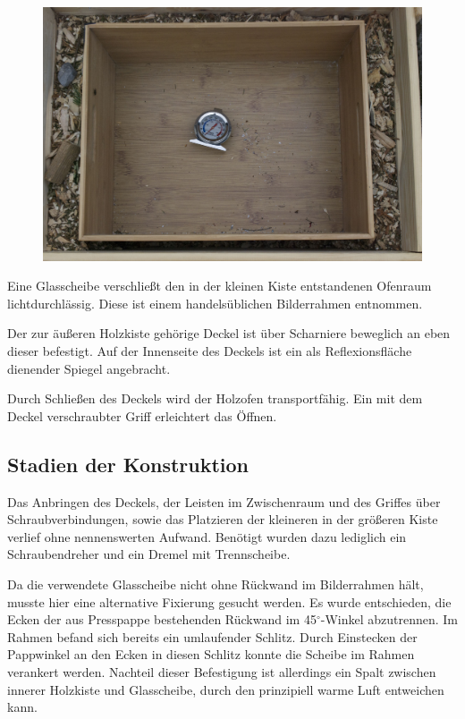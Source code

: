 \begin{figure}
\centering
\includegraphics[width=\textwidth]{figs/ofen/DSC_1584}
\end{figure}

Eine Glasscheibe verschließt den in der kleinen Kiste entstandenen Ofenraum lichtdurchlässig.
Diese ist einem handelsüblichen Bilderrahmen entnommen.

Der zur äußeren Holzkiste gehörige Deckel ist über Scharniere beweglich an eben dieser befestigt. Auf der Innenseite des Deckels ist ein als Reflexionsfläche dienender Spiegel angebracht.

Durch Schließen des Deckels wird der Holzofen transportfähig. Ein mit dem Deckel verschraubter Griff erleichtert das Öffnen.

\subsection{Stadien der Konstruktion} 
Das Anbringen des Deckels, der Leisten im Zwischenraum und des Griffes über Schraubverbindungen, sowie das Platzieren der kleineren in der größeren Kiste verlief ohne nennenswerten Aufwand. Benötigt wurden dazu lediglich ein Schraubendreher und ein Dremel mit Trennscheibe.

Da die verwendete Glasscheibe nicht ohne Rückwand im Bilderrahmen hält, musste hier eine alternative Fixierung gesucht werden. Es wurde entschieden, die Ecken der aus Presspappe bestehenden Rückwand im 45$^\circ$-Winkel abzutrennen. Im Rahmen befand sich bereits ein umlaufender Schlitz. Durch Einstecken der Pappwinkel an den Ecken in diesen Schlitz konnte die Scheibe im Rahmen verankert werden. Nachteil dieser Befestigung ist allerdings ein Spalt zwischen innerer Holzkiste und Glasscheibe, durch den prinzipiell warme Luft entweichen kann.

